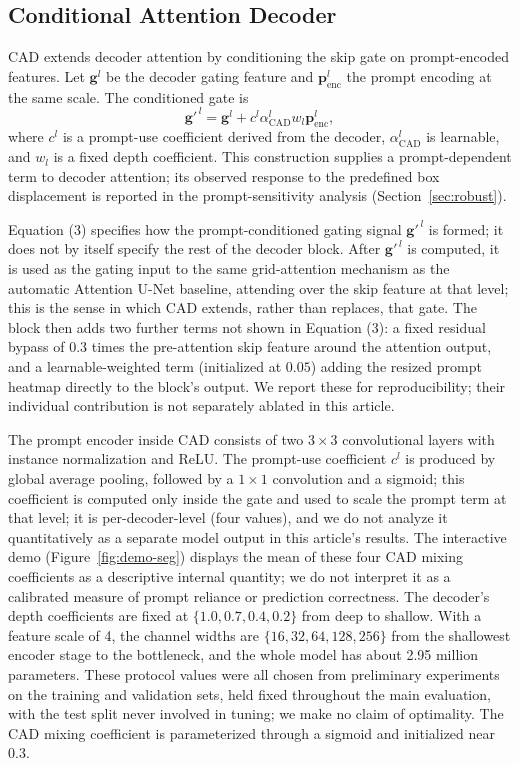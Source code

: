 \subsection{Conditional Attention Decoder}
CAD extends decoder attention by conditioning the skip gate on prompt-encoded features. Let $\mathbf{g}^{l}$ be the decoder gating feature and $\mathbf{p}^{l}_{\mathrm{enc}}$ the prompt encoding at the same scale. The conditioned gate is
\begin{equation}
\mathbf{g}'^{\,l}=\mathbf{g}^{l}+c^{l}\alpha^{l}_{\mathrm{CAD}}w_{l}\mathbf{p}^{l}_{\mathrm{enc}},
\end{equation}
where $c^{l}$ is a prompt-use coefficient derived from the decoder, $\alpha^{l}_{\mathrm{CAD}}$ is learnable, and $w_{l}$ is a fixed depth coefficient. This construction supplies a prompt-dependent term to decoder attention; its observed response to the predefined box displacement is reported in the prompt-sensitivity analysis (Section~\ref{sec:robust}).

Equation (3) specifies how the prompt-conditioned gating signal $\mathbf{g}'^{\,l}$ is formed; it does not by itself specify the rest of the decoder block. After $\mathbf{g}'^{\,l}$ is computed, it is used as the gating input to the same grid-attention mechanism as the automatic Attention U-Net baseline, attending over the skip feature at that level; this is the sense in which CAD extends, rather than replaces, that gate. The block then adds two further terms not shown in Equation (3): a fixed residual bypass of $0.3$ times the pre-attention skip feature around the attention output, and a learnable-weighted term (initialized at $0.05$) adding the resized prompt heatmap directly to the block's output. We report these for reproducibility; their individual contribution is not separately ablated in this article.

The prompt encoder inside CAD consists of two $3\times3$ convolutional layers with instance normalization and ReLU. The prompt-use coefficient $c^{l}$ is produced by global average pooling, followed by a $1\times1$ convolution and a sigmoid; this coefficient is computed only inside the gate and used to scale the prompt term at that level; it is per-decoder-level (four values), and we do not analyze it quantitatively as a separate model output in this article's results. The interactive demo (Figure~\ref{fig:demo-seg}) displays the mean of these four CAD mixing coefficients as a descriptive internal quantity; we do not interpret it as a calibrated measure of prompt reliance or prediction correctness. The decoder's depth coefficients are fixed at $\{1.0,0.7,0.4,0.2\}$ from deep to shallow. With a feature scale of 4, the channel widths are $\{16,32,64,128,256\}$ from the shallowest encoder stage to the bottleneck, and the whole model has about 2.95 million parameters. These protocol values were all chosen from preliminary experiments on the training and validation sets, held fixed throughout the main evaluation, with the test split never involved in tuning; we make no claim of optimality. The CAD mixing coefficient is parameterized through a sigmoid and initialized near 0.3.

